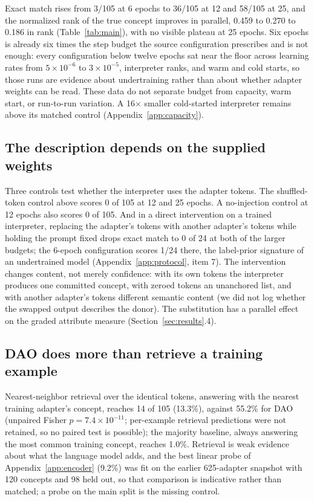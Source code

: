 \documentclass{article}
\begin{document}
Exact match rises from 3/105 at 6 epochs to 36/105 at 12 and 58/105 at 25, and the normalized
rank of the true concept improves in parallel, 0.459 to 0.270 to 0.186 in rank
(Table~\ref{tab:main}), with no visible plateau at 25 epochs. Six epochs is already six times the
step budget the source configuration prescribes and is not enough: every configuration below twelve
epochs sat near the floor across learning rates from $5\times10^{-6}$ to $3\times10^{-5}$,
interpreter ranks, and warm and cold starts, so those runs are evidence about undertraining rather
than about whether adapter weights can be read. These data do not separate budget from capacity,
warm start, or run-to-run variation. A 16$\times$ smaller cold-started interpreter remains above
its matched control (Appendix~\ref{app:capacity}).

\subsection{The description depends on the supplied weights}

Three controls test whether the interpreter uses the adapter tokens. The shuffled-token control
above scores 0 of 105 at 12 and 25 epochs. A no-injection control at 12 epochs also scores 0 of 105.
And in a direct intervention on a trained interpreter, replacing the adapter's tokens with another
adapter's tokens while holding the prompt fixed drops exact match to 0 of 24 at both of the larger
budgets; the 6-epoch configuration scores 1/24 there, the label-prior signature of an undertrained
model (Appendix~\ref{app:protocol}, item 7). The intervention changes content, not merely confidence: with its own tokens the interpreter
produces one committed concept, with zeroed tokens an unanchored list, and with another adapter's
tokens different semantic content (we did not log whether the swapped output describes the donor).
The substitution has a parallel effect on the graded attribute measure (Section~\ref{sec:results}.4).

\subsection{DAO does more than retrieve a training example}

Nearest-neighbor retrieval over the identical tokens, answering with the nearest training
adapter's concept, reaches 14 of 105 (13.3\%), against 55.2\% for DAO (unpaired Fisher
$p = 7.4\times10^{-11}$; per-example retrieval predictions were not retained, so no paired test is
possible); the majority baseline, always answering the most common training concept, reaches 1.0\%.
Retrieval is weak evidence about what the language model adds, and the best linear probe of
Appendix~\ref{app:encoder} (9.2\%) was fit on the earlier 625-adapter snapshot with 120 concepts
and 98 held out, so that comparison is indicative rather than matched; a probe on the main split is
the missing control.
\end{document}
